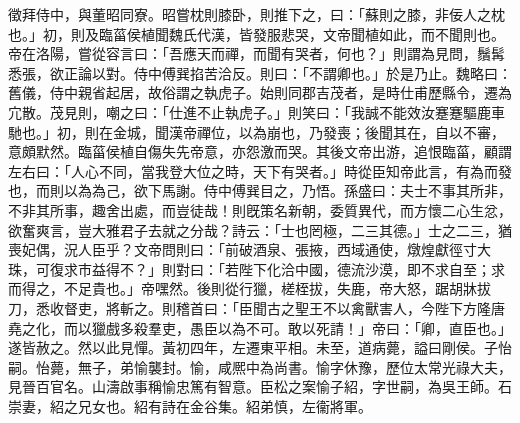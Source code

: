 \begin{pinyinscope}
徵拜侍中，與董昭同寮。昭嘗枕則膝卧，則推下之，曰：「蘇則之膝，非佞人之枕也。」初，則及臨菑侯植聞魏氏代漢，皆發服悲哭，文帝聞植如此，而不聞則也。帝在洛陽，嘗從容言曰：「吾應天而禪，而聞有哭者，何也？」則謂為見問，鬚髯悉張，欲正論以對。侍中傅巽掐苦洽反。則曰：「不謂卿也。」於是乃止。魏略曰：舊儀，侍中親省起居，故俗謂之執虎子。始則同郡吉茂者，是時仕甫歷縣令，遷為宂散。茂見則，嘲之曰：「仕進不止執虎子。」則笑曰：「我誠不能效汝蹇蹇驅鹿車馳也。」初，則在金城，聞漢帝禪位，以為崩也，乃發喪；後聞其在，自以不審，意頗默然。臨菑侯植自傷失先帝意，亦怨激而哭。其後文帝出游，追恨臨菑，顧謂左右曰：「人心不同，當我登大位之時，天下有哭者。」時從臣知帝此言，有為而發也，而則以為為己，欲下馬謝。侍中傅巽目之，乃悟。孫盛曰：夫士不事其所非，不非其所事，趣舍出處，而豈徒哉！則旣策名新朝，委質異代，而方懷二心生忿，欲奮爽言，豈大雅君子去就之分哉？詩云：「士也罔極，二三其德。」士之二三，猶喪妃偶，況人臣乎？文帝問則曰：「前破酒泉、張掖，西域通使，燉煌獻徑寸大珠，可復求市益得不？」則對曰：「若陛下化洽中國，德流沙漠，即不求自至；求而得之，不足貴也。」帝嘿然。後則從行獵，槎桎拔，失鹿，帝大怒，踞胡牀拔刀，悉收督吏，將斬之。則稽首曰：「臣聞古之聖王不以禽獸害人，今陛下方隆唐堯之化，而以獵戲多殺羣吏，愚臣以為不可。敢以死請！」帝曰：「卿，直臣也。」遂皆赦之。然以此見憚。黃初四年，左遷東平相。未至，道病薨，謚曰剛侯。子怡嗣。怡薨，無子，弟愉襲封。愉，咸熈中為尚書。愉字休豫，歷位太常光祿大夫，見晉百官名。山濤啟事稱愉忠篤有智意。臣松之案愉子紹，字世嗣，為吳王師。石崇妻，紹之兄女也。紹有詩在金谷集。紹弟慎，左衞將軍。


\end{pinyinscope}